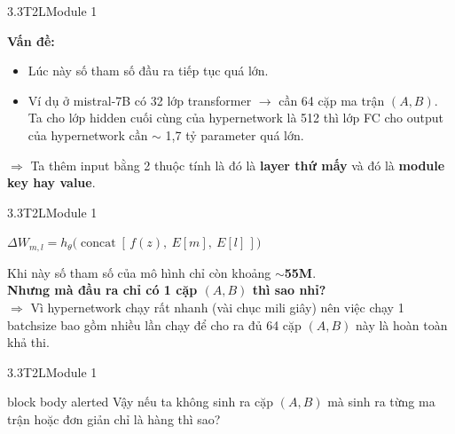 \begin{frame}{3.3\quad T2L}{Module 1}
  \centering{}\par
  \raggedright\small
  \textbf{Vấn đề:}
  \begin{itemize}\tightlist\small
    \item Lúc này số tham số đầu ra tiếp tục quá lớn.
    \item Ví dụ ở mistral-7B có 32 lớp transformer $\rightarrow$ cần 64 cặp ma trận
          $(A,B)$. Ta cho lớp hidden cuối cùng của hypernetwork là 512 thì lớp FC cho
          output của hypernetwork cần $\sim$ 1,7 tỷ parameter quá lớn.
  \end{itemize}
  \vspace{0.2em}
  $\Rightarrow$ Ta thêm input bằng 2 thuộc tính là đó là \textbf{layer thứ mấy} và đó là
  \textbf{module key hay value}.
\end{frame}

\begin{frame}{3.3\quad T2L}{Module 1}
  \centering{}\par
  {\normalsize $\Delta W_{m,l} = h_\theta\big(\operatorname{concat}[\,f(z),\ E[m],\ E[l]\,]\big)$}\par
  \vspace{0.3em}
  \raggedright\small
  Khi này số tham số của mô hình chỉ còn khoảng \textbf{$\sim$55M}.\\
  \textbf{Nhưng mà đầu ra chỉ có 1 cặp $(A,B)$ thì sao nhỉ?}\\
  $\Rightarrow$ Vì hypernetwork chạy rất nhanh (vài chục mili giây) nên việc chạy 1
  batchsize bao gồm nhiều lần chạy để cho ra đủ 64 cặp $(A,B)$ này là hoàn toàn khả thi.
\end{frame}

\begin{frame}{3.3\quad T2L}{Module 1}
  \begin{beamercolorbox}[wd=\linewidth,sep=0.6em]{block body alerted}
    Vậy nếu ta không sinh ra cặp $(A,B)$ mà sinh ra từng ma trận hoặc đơn giản chỉ là hàng
    thì sao?
  \end{beamercolorbox}
  \vspace{1em}
  \centering{}
\end{frame}

